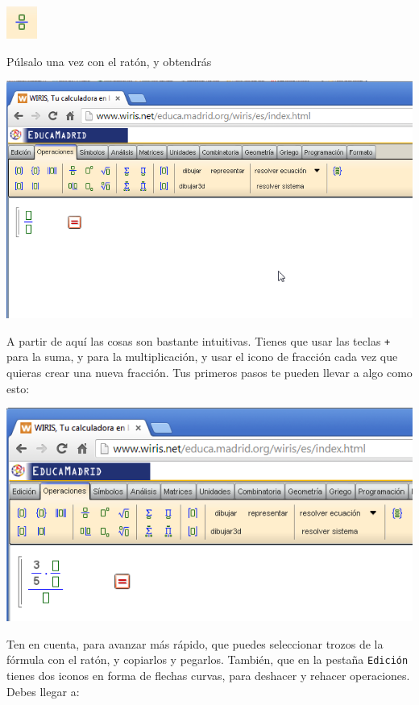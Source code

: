 \documentclass[10pt,a4paper]{article}\usepackage[]{graphicx}\usepackage[]{color}
\begin{document}
     \begin{center}
\includegraphics[width=1cm]{./fig/Tut04-10.png}
\end{center}
Púlsalo una vez con el ratón, y obtendrás
\begin{center}
\includegraphics[width=15cm]{./fig/Tut04-11.png}
\end{center}
A partir de aquí las cosas son bastante intuitivas. Tienes que usar las teclas {\tt +} para la suma, y {\tt *} para la multiplicación, y usar el icono de fracción cada vez que quieras crear una nueva fracción. Tus primeros pasos te pueden llevar a algo como esto:
     \begin{center}
\includegraphics[width=15.5cm]{./fig/Tut04-12.png}
\end{center}
Ten en cuenta, para avanzar más rápido, que puedes seleccionar trozos de la fórmula con el ratón, y copiarlos y pegarlos. También, que en la pestaña {\tt Edición} tienes dos iconos en forma de flechas curvas, para deshacer y rehacer operaciones. Debes llegar a:
\end{document}
